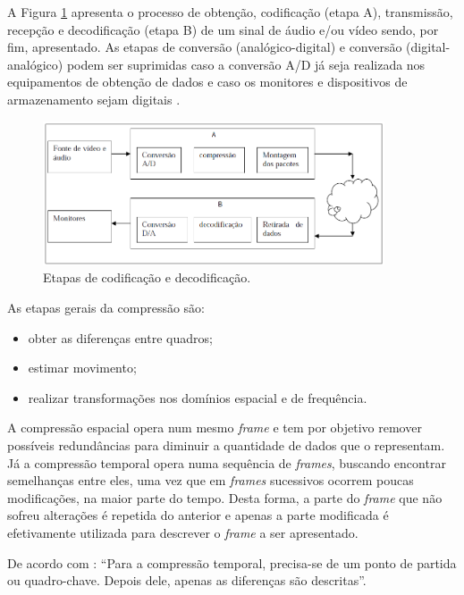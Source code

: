 A Figura \ref{fig:codingprocess} apresenta o processo de obtenção, codificação (etapa A), transmissão, recepção e decodificação (etapa B) de um sinal de áudio e/ou vídeo sendo, por fim, apresentado. As etapas de conversão  (analógico-digital) e conversão  (digital-analógico) podem ser suprimidas caso a conversão A/D já seja realizada nos equipamentos de obtenção de dados e caso os monitores e dispositivos de armazenamento sejam digitais \cite{rehme}.

\begin{figure}[!htb]
	\centering
	\includegraphics[width=0.9\textwidth]{./imgs/codingprocess.png}
	\caption{Etapas de codificação e decodificação.}
	\label{fig:codingprocess}
\end{figure}

As etapas gerais da compressão são:

\begin{itemize}
	\item obter as diferenças entre quadros;
	\item estimar movimento;
	\item realizar transformações nos domínios espacial e de frequência.
\end{itemize}

A compressão espacial opera num mesmo \emph{frame} e tem por objetivo remover possíveis redundâncias para diminuir a quantidade de dados que o representam. Já a compressão temporal opera numa sequência de \emph{frames}, buscando encontrar semelhanças entre eles, uma vez que em \emph{frames} sucessivos ocorrem poucas modificações, na maior parte do tempo. Desta forma, a parte do \emph{frame} que não sofreu alterações é repetida do anterior e apenas a parte modificada é efetivamente utilizada para descrever o \emph{frame} a ser apresentado.

De acordo com \cite{rehme}: “Para a compressão temporal, precisa-se de um ponto de partida ou quadro-chave. Depois dele, apenas as diferenças são descritas”.

